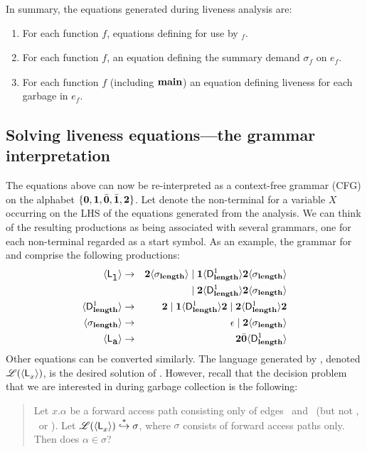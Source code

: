 \documentclass[preprint, 9pt]{sigplanconf}
\begin{document}
In  summary, the  equations  generated during  liveness
analysis are:
\begin{enumerate}
\item   For  each   function  $\mathit{f}$,   equations
  defining  for use by \Lfonly$_{\mathit f}$.
\item For each function $\mathit{f}$, an equation defining the summary
  demand $\sigma_{\mathit f}$ on $e_f$.
\item   For  each   function  $\mathit{f}$   (including
  $\mathbf{main}$) an  equation  defining
  liveness for each garbage in  $e_{\mathit f}$.
\end{enumerate}
\subsection{Solving liveness equations---the grammar
interpretation}\label{sec:grammar-formulation}      The
equations  above   can  now  be  re-interpreted   as  a
context-free    grammar   (CFG)    on   the    alphabet
$\lbrace\mathbf{0},  \mathbf{1},  \bar{\mathbf{0}},  \bar{\mathbf{1}},  {\mathbf{2}}\rbrace$.
Let   denote the  non-terminal for  a variable
$X$  occurring on  the LHS  of the  equations generated
from  the  analysis.  We  can  think  of the  resulting
productions as being  associated with several grammars,
one for each non-terminal  regarded as
a  start  symbol.   As  an  example,  the  grammar  for
\var{\Lanv{\xl}{}} and \var{\Lanv{\pa}{}}    comprise     the     following
productions:
\begin{eqnarray*}
  \langle \mathsf{L}_{{\mbox{\tt l}}}^{}\rangle  &\rightarrow& 
  {\mathbf{2}}\langle \sigma_{\mathbf{length}}\rangle \mid \mathbf{1} \langle \mathsf{D}_{\mathit {\mathbf{length}}}^{1}\rangle{\ensuremath{{\mathbf{2}}}\ensuremath{\langle \sigma_{\mathbf{length}}\rangle}}  \\
  & & \mid
  {\mathbf{2}}\langle \mathsf{D}_{\mathit {\mathbf{length}}}^{1}\rangle{\ensuremath{{\mathbf{2}}}\ensuremath{\langle \sigma_{\mathbf{length}}\rangle}} \\
  \langle \mathsf{D}_{\mathit {\mathbf{length}}}^{1}\rangle &\rightarrow& {\mathbf{2}} \mid
  \mathbf{1}\langle \mathsf{D}_{\mathit {\mathbf{length}}}^{1}\rangle{\mathbf{2}}
       \mid {\mathbf{2}}\langle \mathsf{D}_{\mathit {\mathbf{length}}}^{1}\rangle{\ensuremath{{\mathbf{2}}}}\\
\langle {\sigma_{\ensuremath{\mathbf{length}}}} \rangle
&\rightarrow&
\epsilon  \mid {\mathbf{2}}\langle{\sigma_{\ensuremath{\mathbf{length}}}}\rangle \\
\langle \mathsf{L}_{{\mbox{\tt a}}}^{}\rangle &\rightarrow& {\mathbf{2}} \bar{\mathbf{0}} \langle \mathsf{D}_{\mathit {\mathbf{length}}}^{1}\rangle
\end{eqnarray*}
Other  equations  can   be  converted  similarly.   The
language   generated   by  ,   denoted
$\mathscr{L}(\langle \mathsf{L}_{{x}}^{}\rangle)$,   is    the   desired
solution  of  .    
However, recall that the decision problem that we are interested in
during garbage collection is the following: 
\begin{quote}
Let $x.\alpha$ be a forward access path consisting only
of edges  \acar\ and \acdr\  (but not \bcar,  \bcdr\ or
\clazy).       Let      $\mathscr{L}(\langle \mathsf{L}_{{x}}^{}\rangle)
\stackrel{*}{\hookrightarrow}  \sigma$, where  $\sigma$
consists  of  forward  access  paths  only.  Then  does
$\alpha \in \sigma$?
\end{quote}
\end{document}
